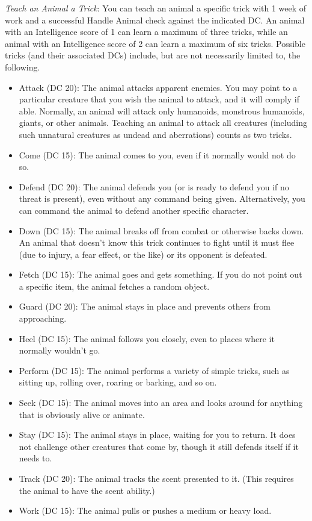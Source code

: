 \textit{Teach an Animal a Trick}: You can teach an animal a specific trick with 1 week of work and a successful Handle Animal check against the indicated DC. An animal with an Intelligence score of 1 can learn a maximum of three tricks, while an animal with an Intelligence score of 2 can learn a maximum of six tricks. Possible tricks (and their associated DCs) include, but are not necessarily limited to, the following.
				\begin{itemize}\item  Attack (DC 20): The animal attacks apparent enemies. You may point to a particular creature that you wish the animal to attack, and it will comply if able. Normally, an animal will attack only humanoids, monstrous humanoids, giants, or other animals. Teaching an animal to attack all creatures (including such unnatural creatures as undead and aberrations) counts as two tricks.
				\item  Come (DC 15): The animal comes to you, even if it normally would not do so.
				\item  Defend (DC 20): The animal defends you (or is ready to defend you if no threat is present), even without any command being given. Alternatively, you can command the animal to defend another specific character.
				\item  Down (DC 15): The animal breaks off from combat or otherwise backs down. An animal that doesn't know this trick continues to fight until it must flee (due to injury, a fear effect, or the like) or its opponent is defeated.
				\item  Fetch (DC 15): The animal goes and gets something. If you do not point out a specific item, the animal fetches a random object.
				\item  Guard (DC 20): The animal stays in place and prevents others from approaching.
				\item  Heel (DC 15): The animal follows you closely, even to places where it normally wouldn't go.
				\item  Perform (DC 15): The animal performs a variety of simple tricks, such as sitting up, rolling over, roaring or barking, and so on.
				\item  Seek (DC 15): The animal moves into an area and looks around for anything that is obviously alive or animate.
				\item  Stay (DC 15): The animal stays in place, waiting for you to return. It does not challenge other creatures that come by, though it still defends itself if it needs to.
				\item  Track (DC 20): The animal tracks the scent presented to it. (This requires the animal to have the scent ability.)
				\item  Work (DC 15): The animal pulls or pushes a medium or heavy load.
\end{itemize}
				
